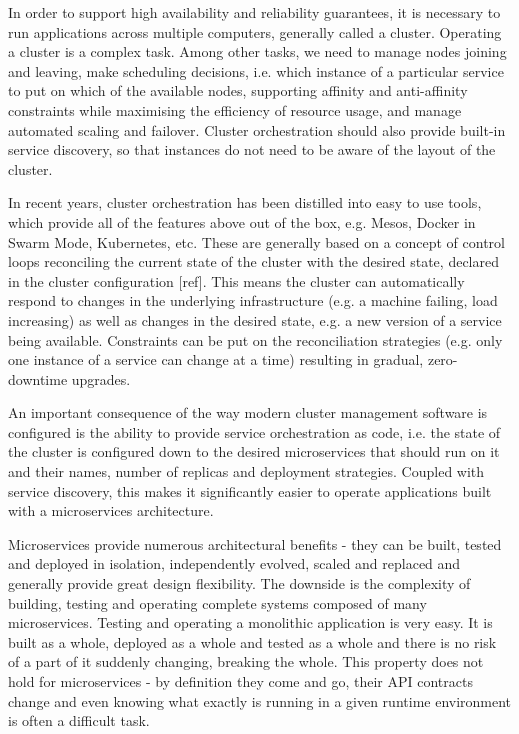 \documentclass[reprint,amsmath,amssymb,aps]{revtex4-1}
\begin{document}
In order to support high availability and reliability guarantees, it is necessary to run applications across multiple computers, generally called a cluster. Operating a cluster is a complex task. Among other tasks, we need to manage nodes joining and leaving, make scheduling decisions, i.e. which instance of a particular service to put on which of the available nodes, supporting affinity and anti-affinity constraints while maximising the efficiency of resource usage, and manage automated scaling and failover. Cluster orchestration should also provide built-in service discovery, so that instances do not need to be aware of the layout of the cluster.

In recent years, cluster orchestration has been distilled into easy to use tools, which provide all of the features above out of the box, e.g. Mesos, Docker in Swarm Mode, Kubernetes, etc. These are generally based on a concept of control loops reconciling the current state of the cluster with the desired state, declared in the cluster configuration [ref]. This means the cluster can automatically respond to changes in the underlying infrastructure (e.g. a machine failing, load increasing) as well as changes in the desired state, e.g. a new version of a service being available. Constraints can be put on the reconciliation strategies (e.g. only one instance of a service can change at a time) resulting in gradual, zero-downtime upgrades.

An important consequence of the way modern cluster management software is configured is the ability to provide service orchestration as code, i.e. the state of the cluster is configured down to the desired microservices that should run on it and their names, number of replicas and deployment strategies. Coupled with service discovery, this makes it significantly easier to operate applications built with a microservices architecture. 

Microservices provide numerous architectural benefits - they can be built, tested and deployed in isolation, independently evolved, scaled and replaced and generally provide great design flexibility. The downside is the complexity of building, testing and operating complete systems composed of many microservices. Testing and operating a monolithic application is very easy. It is built as a whole, deployed as a whole and tested as a whole and there is no risk of a part of it suddenly changing, breaking the whole. This property does not hold for microservices - by definition they come and go, their API contracts change and even knowing what exactly is running in a given runtime environment is often a difficult task.
\end{document}
